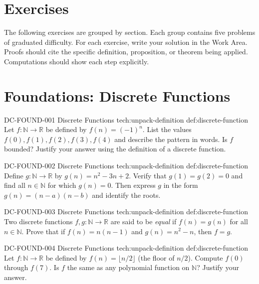 
\section*{Exercises}

The following exercises are grouped by section. Each group contains five
problems of graduated difficulty. For each exercise, write your solution
in the Work Area. Proofs should cite the specific definition, proposition,
or theorem being applied. Computations should show each step explicitly.

\section*{Foundations: Discrete Functions}

\exstubgenfull
  {DC-FOUND-001}
  {Discrete Functions}
  {tech:unpack-definition}
  {def:discrete-function}
  {Let \(f : \mathbb{N} \to \mathbb{R}\) be defined by \(f(n) = (-1)^n\).
  List the values \(f(0), f(1), f(2), f(3), f(4)\) and describe the
  pattern in words. Is \(f\) bounded? Justify your answer using the
  definition of a discrete function.}

\exstubgenfull
  {DC-FOUND-002}
  {Discrete Functions}
  {tech:unpack-definition}
  {def:discrete-function}
  {Define \(g : \mathbb{N} \to \mathbb{R}\) by \(g(n) = n^2 - 3n + 2\).
  Verify that \(g(1) = g(2) = 0\) and find all \(n \in \mathbb{N}\) for which
  \(g(n) = 0\). Then express \(g\) in the form \(g(n) = (n-a)(n-b)\) and
  identify the roots.}

\exstubgenfull
  {DC-FOUND-003}
  {Discrete Functions}
  {tech:unpack-definition}
  {def:discrete-function}
  {Two discrete functions \(f, g : \mathbb{N} \to \mathbb{R}\) are said to be
  \emph{equal} if \(f(n) = g(n)\) for all \(n \in \mathbb{N}\). Prove that
  if \(f(n) = n(n-1)\) and \(g(n) = n^2 - n\), then \(f = g\).}

\exstubgenfull
  {DC-FOUND-004}
  {Discrete Functions}
  {tech:unpack-definition}
  {def:discrete-function}
  {Let \(f : \mathbb{N} \to \mathbb{R}\) be defined by
  \(f(n) = \lfloor n/2 \rfloor\) (the floor of \(n/2\)).
  Compute \(f(0)\) through \(f(7)\). Is \(f\) the same as any
  polynomial function on \(\mathbb{N}\)? Justify your answer.}

